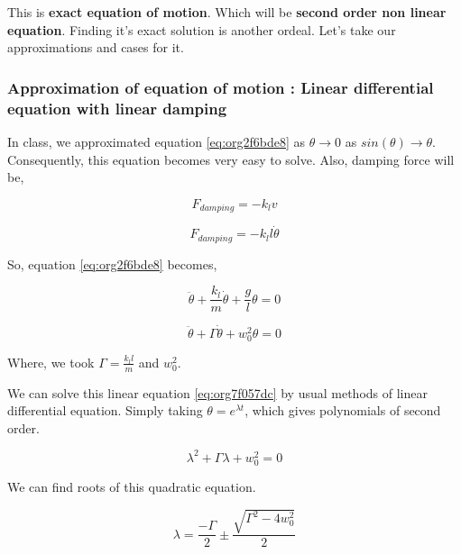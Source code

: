 \documentclass{article}
\begin{document}
This is \textbf{exact equation of motion}. Which will be \textbf{second order non linear equation}. Finding it's exact solution is another ordeal. Let's take our approximations and cases for it.

\subsubsection{Approximation of equation of motion : Linear differential equation with linear damping}
\label{sec:orgcae63fa}

In class, we approximated equation \ref{eq:org2f6bde8} as \(\theta \to 0\) as \(sin(\theta) \to \theta\). Consequently, this equation becomes very easy to solve. Also, damping force will be,

\begin{equation*}
\label{eq:org64c41ae}
F_{damping}=-k_{l}v
\end{equation*}

\begin{equation*}
\label{eq:orge333cac}
F_{damping}=-k_{l}l\dot{\theta}
\end{equation*}

So, equation \ref{eq:org2f6bde8} becomes,

\begin{equation}
\label{eq:org3d95b41}
\ddot{\theta}+\frac{k_{l}}{m}\dot{\theta}+\frac{g}{l}\theta=0
\end{equation}

\begin{equation}
\label{eq:org7f057dc}
\ddot{\theta}+\Gamma\dot{\theta}+w_{0}^{2}\theta=0
\end{equation}

Where, we took \(\Gamma = \frac{k_{l}l}{m}\) and \(w_{0}^{2}\).

We can solve this linear equation \ref{eq:org7f057dc} by usual methods of linear differential equation. Simply taking \(\theta=e^{\lambda t}\), which gives polynomials of second order.

\begin{equation}
\label{eq:org0b486b4}
\lambda^{2}+\Gamma\lambda+w_{0}^{2}=0
\end{equation}

We can find roots of this quadratic equation.

\begin{equation}
\label{eq:org37b5073}
\lambda = \frac{-\Gamma}{2} \pm \frac{\sqrt{\Gamma^{2}-4w_{0}^{2}}}{2}
\end{equation}
\end{document}
